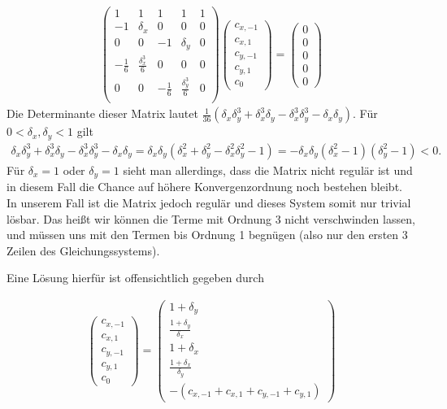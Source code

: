 \begin{solution}
  \begin{align*}
    \begin{pmatrix}
      1 & 1 & 1 & 1 & 1 \\
      -1 & \delta_x & 0 & 0 & 0 \\
      0 & 0 & -1 & \delta_y & 0 \\
      -\frac{1}{6} & \frac{\delta_x^3}{6} & 0 & 0 & 0 \\
      0 & 0 & -\frac{1}{6} & \frac{\delta_y^3}{6} & 0 \\
    \end{pmatrix}
    \begin{pmatrix}
      c_{x,-1} \\
      c_{x,1} \\
      c_{y,-1} \\
      c_{y,1} \\
      c_{0}
    \end{pmatrix} =
    \begin{pmatrix}
      0 \\ 0 \\ 0 \\ 0 \\ 0
    \end{pmatrix}
  \end{align*}
  Die Determinante dieser Matrix lautet
  $\frac{1}{36}(\delta_x\delta_y^3 + \delta_x^3\delta_y
  - \delta_x^3\delta_y^3 - \delta_x\delta_y)$.
  Für $0 < \delta_x,\delta_y < 1$ gilt
  \begin{align*}
    \delta_x\delta_y^3 + \delta_x^3\delta_y
    - \delta_x^3\delta_y^3 - \delta_x\delta_y =
    \delta_x\delta_y(\delta_x^2 + \delta_y^2 - \delta_x^2\delta_y^2 - 1) =
    -\delta_x\delta_y(\delta_x^2 - 1)(\delta_y^2 - 1) < 0.
  \end{align*}
  Für $\delta_x = 1$ oder $\delta_y = 1$ sieht man allerdings, dass die Matrix nicht regulär
  ist und in diesem Fall die Chance auf höhere Konvergenzordnung noch bestehen bleibt.
  In unserem Fall ist die Matrix jedoch regulär und dieses System somit nur trivial lösbar.
  Das heißt wir können die Terme mit Ordnung 3 nicht verschwinden lassen, und müssen uns mit den Termen bis Ordnung 1 begnügen (also nur den ersten 3 Zeilen des Gleichungssystems).

  Eine Lösung hierfür ist offensichtlich gegeben durch

  \begin{align*}
  \begin{pmatrix}
  c_{x,-1} \\
  c_{x,1} \\
  c_{y,-1} \\
  c_{y,1} \\
  c_{0}
  \end{pmatrix} =
  \begin{pmatrix}
    1+\delta_y \\ \frac{1+\delta_y}{\delta_x} \\ 1+\delta_x \\ \frac{1+\delta_x}{\delta_y} \\ -(c_{x,-1}+ c_{x,1} + c_{y,-1} + c_{y,1})
  \end{pmatrix}
  \end{align*}


\end{solution}
